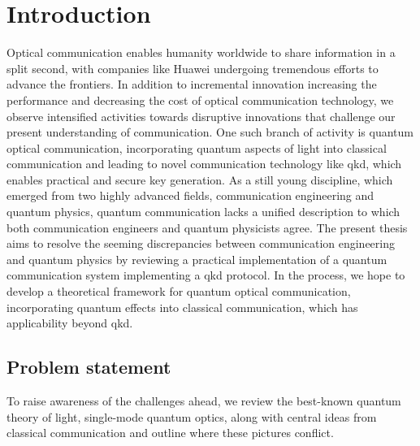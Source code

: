 \chapter*{Introduction}

Optical communication enables humanity worldwide to share information in a split second, with companies like Huawei undergoing tremendous efforts to advance the frontiers.
In addition to incremental innovation increasing the performance and decreasing the cost of optical communication technology, we observe intensified activities towards disruptive innovations that challenge our present understanding of communication.
One such branch of activity is quantum optical communication, incorporating quantum aspects of light into classical communication and leading to novel communication technology like \gls{qkd}, which enables practical and secure key generation.
As a still young discipline, which emerged from two highly advanced fields, communication engineering and quantum physics, quantum communication lacks a unified description to which both communication engineers and quantum physicists agree.
The present thesis aims to resolve the seeming discrepancies between communication engineering and quantum physics by reviewing a practical implementation of a quantum communication system implementing a \gls{qkd} protocol.
In the process, we hope to develop a theoretical framework for quantum optical communication, incorporating quantum effects into classical communication, which has applicability beyond \gls{qkd}.

\section*{Problem statement}

To raise awareness of the challenges ahead, we review the best-known quantum theory of light, single-mode quantum optics, along with central ideas from classical communication and outline where these pictures conflict.


